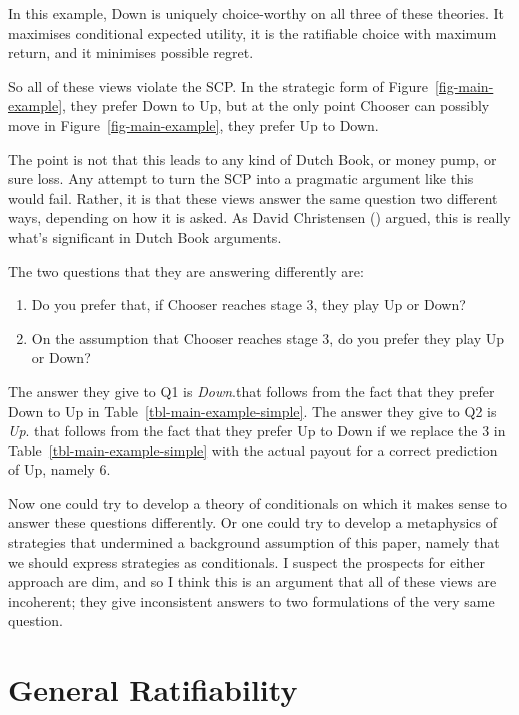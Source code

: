 \documentclass[
  10pt,
  letterpaper,
  DIV=11,
  numbers=noendperiod,
  twoside]{scrartcl}
\providecommand{\tightlist}{%
  \setlength{\itemsep}{0pt}\setlength{\parskip}{0pt}}\usepackage{longtable,booktabs,array}
\begin{document}
In this example, Down is uniquely choice-worthy on all three of these
theories. It maximises conditional expected utility, it is the
ratifiable choice with maximum return, and it minimises possible regret.

So all of these views violate the SCP. In the strategic form of
Figure~\ref{fig-main-example}, they prefer Down to Up, but at the only
point Chooser can possibly move in Figure~\ref{fig-main-example}, they
prefer Up to Down.

The point is not that this leads to any kind of Dutch Book, or money
pump, or sure loss. Any attempt to turn the SCP into a pragmatic
argument like this would fail. Rather, it is that these views answer the
same question two different ways, depending on how it is asked. As David
Christensen () argued, this is
really what's significant in Dutch Book arguments.

The two questions that they are answering differently are:

\begin{enumerate}
\def\labelenumi{\arabic{enumi}.}
\tightlist
\item
  Do you prefer that, if Chooser reaches stage 3, they play Up or Down?
\item
  On the assumption that Chooser reaches stage 3, do you prefer they
  play Up or Down?
\end{enumerate}

The answer they give to Q1 is \emph{Down}.that follows from the fact
that they prefer Down to Up in Table~\ref{tbl-main-example-simple}. The
answer they give to Q2 is \emph{Up}. that follows from the fact that
they prefer Up to Down if we replace the 3 in
Table~\ref{tbl-main-example-simple} with the actual payout for a correct
prediction of Up, namely 6.

Now one could try to develop a theory of conditionals on which it makes
sense to answer these questions differently. Or one could try to develop
a metaphysics of strategies that undermined a background assumption of
this paper, namely that we should express strategies as conditionals. I
suspect the prospects for either approach are dim, and so I think this
is an argument that all of these views are incoherent; they give
inconsistent answers to two formulations of the very same question.

\section{General Ratifiability}\label{sec-general-ratify}
\end{document}
